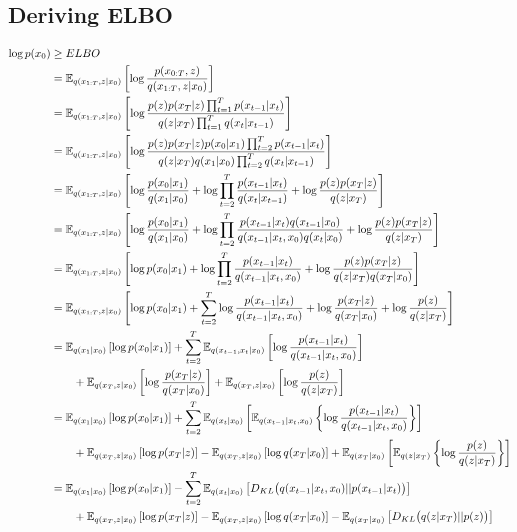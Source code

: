 \subsection{Deriving ELBO}

\begin{align}
    \log p(x_0) &\ge ELBO\\
    &=\mathbb E_{q(x_{1:T},z|x_0)}\left[\log \frac{p(x_{0:T},z)}{q(x_{1:T},z|x_0)}\right]\\
    &= \mathbb E_{q(x_{1:T},z|x_0)}\left[\log \frac{p(z) p(x_T|z)\prod_{t=1}^T p(x_{t-1}|x_t)}{q(z|x_T)\prod_{t=1}^T q(x_t|x_{t-1})}\right]\\
    &= \mathbb E_{q(x_{1:T},z|x_0)}\left[\log \frac{p(z) p(x_T|z)p(x_0|x_1)\prod_{t=2}^T p(x_{t-1}|x_t)}{q(z|x_T)q(x_1|x_0)\prod_{t=2}^T q(x_t|x_{t-1})}\right]\\
    &= \mathbb E_{q(x_{1:T},z|x_0)}\left[\log \frac{p(x_0|x_1)}{q(x_1|x_0)}
    +
    \log \prod_{t=2}^T \frac{p(x_{t-1}|x_t)}{q(x_t|x_{t-1})}
    +
    \log \frac{p(z) p(x_T|z)}{q(z|x_T)}\right]\\
    &= \mathbb E_{q(x_{1:T},z|x_0)}\left[
    \log \frac{p(x_0|x_1)}{q(x_1|x_0)}
    +
    \log \prod_{t=2}^T \frac{p(x_{t-1}|x_t)q(x_{t-1}| x_0)}{q(x_{t-1}|x_t, x_0)q(x_t|x_0)}
    +
    \log \frac{p(z) p(x_T|z)}{q(z|x_T)}\right]\\
    &= \mathbb E_{q(x_{1:T},z|x_0)}\left[
    \log p(x_0|x_1)
    +
    \log \prod_{t=2}^T \frac{p(x_{t-1}|x_t)}{q(x_{t-1}|x_t, x_0)}
    +
    \log \frac{p(z) p(x_T|z)}{q(z|x_T)q(x_T|x_0)}\right]\\
    &= \mathbb E_{q(x_{1:T},z|x_0)}\left[
    \log p(x_0|x_1)
    +
    \sum_{t=2}^T \log \frac{p(x_{t-1}|x_t)}{q(x_{t-1}|x_t, x_0)}
    +
    \log \frac{p(x_T|z)}{q(x_T|x_0)}
    +
    \log \frac{p(z)}{q(z|x_T)}\right]\\
    &= \mathbb E_{q(x_1|x_0)}\left[
    \log p(x_0|x_1)\right]
    +
    \sum_{t=2}^T \mathbb E_{q(x_{t-1},x_t|x_0)}\left[\log \frac{p(x_{t-1}|x_t)}{q(x_{t-1}|x_t, x_0)}\right]\\
    &\qquad +
    \mathbb E_{q(x_T,z|x_0)}\left[
    \log \frac{p(x_T|z)}{q(x_T|x_0)}\right]
    +
    \mathbb E_{q(x_{T},z|x_0)}\left[
    \log \frac{p(z)}{q(z|x_T)}\right]\\
    &= \mathbb E_{q(x_1|x_0)}\left[
    \log p(x_0|x_1)\right]
    +
    \sum_{t=2}^T \mathbb E_{q(x_t|x_0)}\left[\mathbb E_{q(x_{t-1}|x_t,x_0)}\left\{\log \frac{p(x_{t-1}|x_t)}{q(x_{t-1}|x_t, x_0)}\right\}\right]\\
    &\qquad +
    \mathbb E_{q(x_T,z|x_0)}\left[
    \log p(x_T|z)\right]
    -
    \mathbb E_{q(x_T,z|x_0)}\left[
    \log {q(x_T|x_0)}\right]
    +
    \mathbb E_{q(x_{T}|x_0)}\left[\mathbb E_{q(z|x_T)}\left\{
    \log \frac{p(z)}{q(z|x_T)}\right\}\right]\\
    &= \mathbb E_{q(x_1|x_0)}\left[
    \log p(x_0|x_1)\right]
    -
    \sum_{t=2}^T \mathbb E_{q(x_t|x_0)}\left[D_{KL}\big(q(x_{t-1}|x_t, x_0)||p(x_{t-1}|x_t)\big)\right]\\
    &\qquad +
    \mathbb E_{q(x_T,z|x_0)}\left[
    \log p(x_T|z)\right]
    -
    \mathbb E_{q(x_T,z|x_0)}\left[
    \log {q(x_T|x_0)}\right]
    -
    \mathbb E_{q(x_T|x_0)}\left[
    D_{KL}\big(q(z|x_T)||p(z)\big)\right]\\
\end{align}
